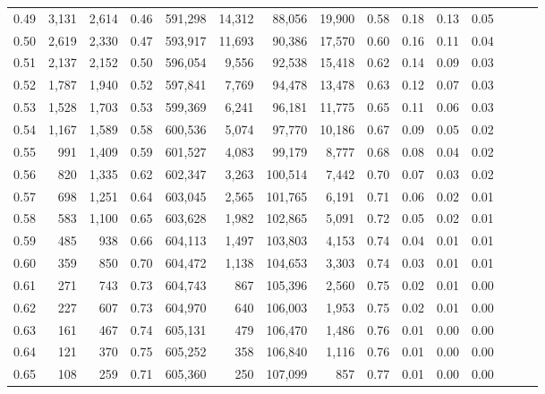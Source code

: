 \begin{tabular}{rrrrrrrrrrrrrrr}
0.49 &   3,131 &  2,614 &  0.46 &  591,298 &   14,312 &   88,056 &   19,900 &  0.58 &  0.18 &  0.13 &      0.05 \\
0.50 &   2,619 &  2,330 &  0.47 &  593,917 &   11,693 &   90,386 &   17,570 &  0.60 &  0.16 &  0.11 &      0.04 \\
0.51 &   2,137 &  2,152 &  0.50 &  596,054 &    9,556 &   92,538 &   15,418 &  0.62 &  0.14 &  0.09 &      0.03 \\
0.52 &   1,787 &  1,940 &  0.52 &  597,841 &    7,769 &   94,478 &   13,478 &  0.63 &  0.12 &  0.07 &      0.03 \\
0.53 &   1,528 &  1,703 &  0.53 &  599,369 &    6,241 &   96,181 &   11,775 &  0.65 &  0.11 &  0.06 &      0.03 \\
0.54 &   1,167 &  1,589 &  0.58 &  600,536 &    5,074 &   97,770 &   10,186 &  0.67 &  0.09 &  0.05 &      0.02 \\
0.55 &     991 &  1,409 &  0.59 &  601,527 &    4,083 &   99,179 &    8,777 &  0.68 &  0.08 &  0.04 &      0.02 \\
0.56 &     820 &  1,335 &  0.62 &  602,347 &    3,263 &  100,514 &    7,442 &  0.70 &  0.07 &  0.03 &      0.02 \\
0.57 &     698 &  1,251 &  0.64 &  603,045 &    2,565 &  101,765 &    6,191 &  0.71 &  0.06 &  0.02 &      0.01 \\
0.58 &     583 &  1,100 &  0.65 &  603,628 &    1,982 &  102,865 &    5,091 &  0.72 &  0.05 &  0.02 &      0.01 \\
0.59 &     485 &    938 &  0.66 &  604,113 &    1,497 &  103,803 &    4,153 &  0.74 &  0.04 &  0.01 &      0.01 \\
0.60 &     359 &    850 &  0.70 &  604,472 &    1,138 &  104,653 &    3,303 &  0.74 &  0.03 &  0.01 &      0.01 \\
0.61 &     271 &    743 &  0.73 &  604,743 &      867 &  105,396 &    2,560 &  0.75 &  0.02 &  0.01 &      0.00 \\
0.62 &     227 &    607 &  0.73 &  604,970 &      640 &  106,003 &    1,953 &  0.75 &  0.02 &  0.01 &      0.00 \\
0.63 &     161 &    467 &  0.74 &  605,131 &      479 &  106,470 &    1,486 &  0.76 &  0.01 &  0.00 &      0.00 \\
0.64 &     121 &    370 &  0.75 &  605,252 &      358 &  106,840 &    1,116 &  0.76 &  0.01 &  0.00 &      0.00 \\
0.65 &     108 &    259 &  0.71 &  605,360 &      250 &  107,099 &      857 &  0.77 &  0.01 &  0.00 &      0.00 \\

\end{tabular}
